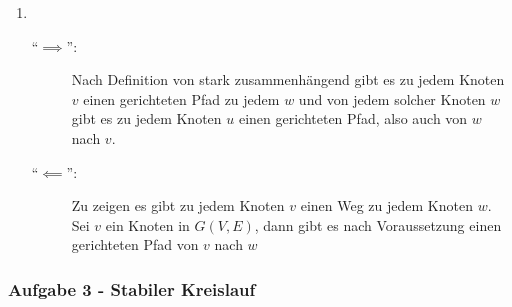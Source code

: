 \documentclass[11pt]{scrartcl}
\newcommand{\task}[1]{\subsubsection*{#1}}
\begin{document}
\begin{enumerate}[label=(\alph*)]
	\item ~
		\begin{description}
			\item[``$ \implies  $'':] Nach Definition von stark zusammenhängend gibt es zu jedem Knoten $ v $ einen gerichteten Pfad zu jedem $ w $ und von jedem solcher Knoten $ w $ gibt es zu jedem Knoten $ u $ einen gerichteten Pfad, also auch von $ w $ nach $ v $.
			\item[``$ \impliedby  $'':] Zu zeigen es gibt zu jedem Knoten $ v $ einen Weg zu jedem Knoten $ w $.
				Sei $ v $ ein Knoten in $ G(V, E) $, dann gibt es nach Voraussetzung einen gerichteten Pfad von $ v $ nach $ w $
		\end{description}
\end{enumerate}

\task{Aufgabe 3 - Stabiler Kreislauf}
\end{document}
